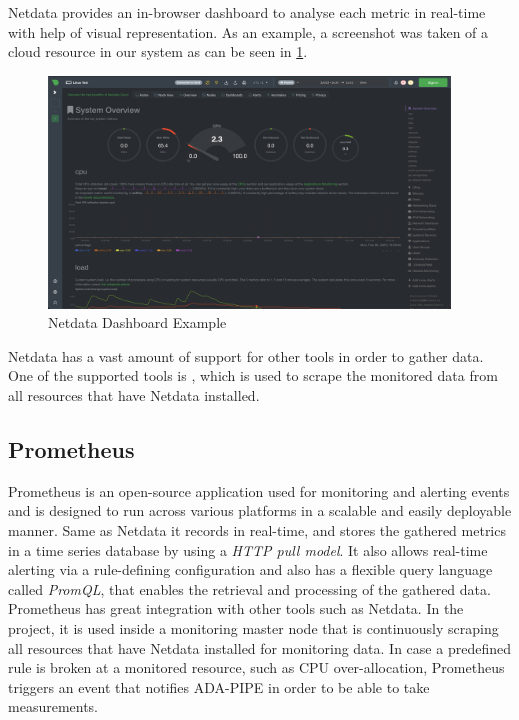 \documentclass{article}
\begin{document}
            Netdata provides an in-browser dashboard to analyse each metric in real-time with help of visual representation. As an example, a screenshot was taken of a cloud resource in our system as can be seen in \ref{fig:netdata-dashboard}.

            \begin{figure}[h!]
                \centering
                \includegraphics[width=0.95\textwidth]{figures/netdata.png}
                \caption{Netdata Dashboard Example}
                \label{fig:netdata-dashboard}
            \end{figure}
            Netdata has a vast amount of support for other tools in order to gather data. 
            One of the supported tools is , which is used to scrape the monitored data from all resources that have Netdata installed.


        \subsection{Prometheus}
        \label{sec:prometheus-monitoring}
            Prometheus \cite{prometheusOverviewPrometheus} is an open-source application used for monitoring and alerting events and is designed to run across various platforms in a scalable and easily deployable manner.
            Same as Netdata it records in real-time, and stores the gathered metrics in a time series database by using a \emph{HTTP pull model}. It also allows real-time alerting via a rule-defining configuration and also has a flexible query language called \emph{PromQL}, that enables the retrieval and processing of the gathered data. Prometheus has great integration with other tools such as Netdata.
            In the project, it is used inside a monitoring master node that is continuously scraping all resources that have Netdata installed for monitoring data. In case a predefined rule is broken at a monitored resource, such as CPU over-allocation, Prometheus triggers an event that notifies ADA-PIPE in order to be able to take measurements.
            
\end{document}
